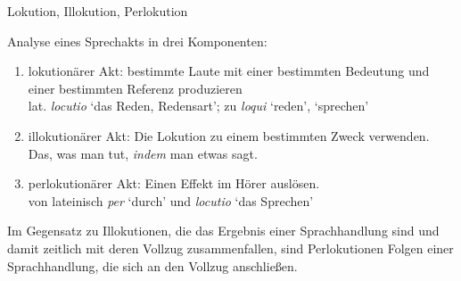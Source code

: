\begin{frame}{Lokution, Illokution, Perlokution}
  
Analyse eines Sprechakts in drei Komponenten:

\begin{enumerate}
\item \alert{lokutionärer Akt}: bestimmte Laute mit einer bestimmten Bedeutung und einer bestimmten
  Referenz produzieren\\
lat. \emph{locutio} `das Reden, Redensart'; zu \emph{loqui} `reden', `sprechen'
\pause
\item \alert{illokutionärer Akt}: Die Lokution zu einem bestimmten Zweck verwenden.\\
 Das, was man tut, \emph{indem} man etwas sagt.\pause
\item \alert{perlokutionärer Akt}: Einen Effekt im Hörer auslösen.\\
von lateinisch \emph{per} `durch' und \emph{locutio} `das Sprechen'
\end{enumerate}

Im Gegensatz zu Illokutionen, die das Ergebnis einer Sprachhandlung sind und damit zeitlich mit deren Vollzug zusammenfallen, sind Perlokutionen Folgen einer Sprachhandlung, die sich an den Vollzug anschließen.


\end{frame}




